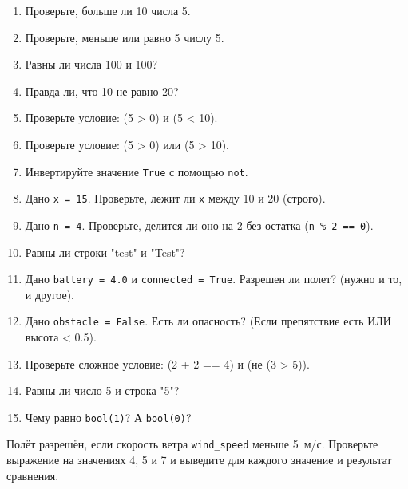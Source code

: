\begin{enumerate}
    \item Проверьте, больше ли 10 числа 5.
    \item Проверьте, меньше или равно 5 числу 5.
    \item Равны ли числа 100 и 100?
    \item Правда ли, что 10 не равно 20?
    \item Проверьте условие: (5 > 0) и (5 < 10).
    \item Проверьте условие: (5 > 0) или (5 > 10).
    \item Инвертируйте значение \texttt{True} с помощью \texttt{not}.
    \item Дано \texttt{x = 15}. Проверьте, лежит ли \texttt{x} между 10 и 20 (строго).
    \item Дано \texttt{n = 4}. Проверьте, делится ли оно на 2 без остатка (\texttt{n \% 2 == 0}).
    \item Равны ли строки "test" и "Test"?
    \item Дано \texttt{battery = 4.0} и \texttt{connected = True}. Разрешен ли полет? (нужно и то, и другое).
    \item Дано \texttt{obstacle = False}. Есть ли опасность? (Если препятствие есть ИЛИ высота < 0.5).
    \item Проверьте сложное условие: (2 + 2 == 4) и (не (3 > 5)).
    \item Равны ли число 5 и строка "5"?
    \item Чему равно \texttt{bool(1)}? А \texttt{bool(0)}?
\end{enumerate}

\begin{taskbox}
Полёт разрешён, если скорость ветра \texttt{wind\_speed} меньше 5~м/с. Проверьте выражение на значениях 4, 5 и 7 и выведите для каждого значение и результат сравнения.
\end{taskbox}
